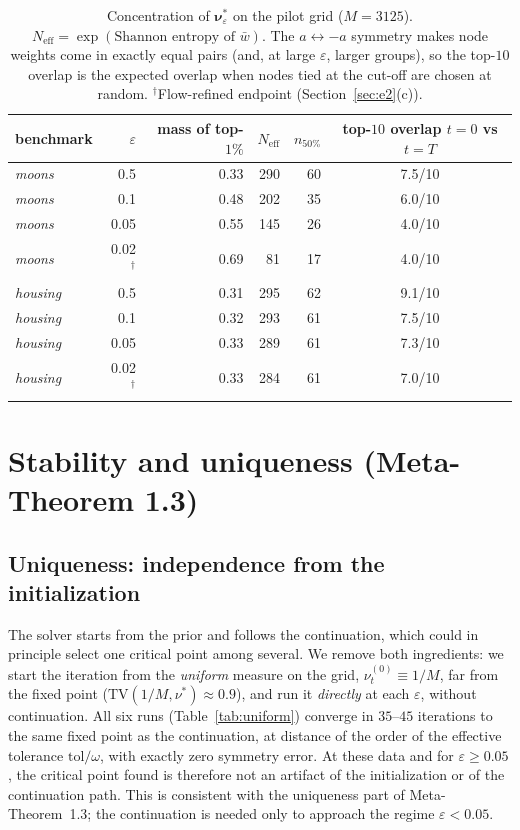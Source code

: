 \documentclass[11pt,leqno]{amsart}
\newcommand{\bnu}{\boldsymbol{\nu}}
\newcommand{\eps}{\varepsilon}
\newcommand{\TV}{\mathrm{TV}}
\numberwithin{equation}{section}
\theoremstyle{definition}
\begin{document}
\begin{table}[ht]
\centering\small
\begin{tabular}{l r rrrc}
\toprule
benchmark & $\eps$ & mass of top-$1\%$ & $N_{\mathrm{eff}}$ & $n_{50\%}$ &
top-$10$ overlap $t=0$ vs $t=T$\\
\midrule
\emph{moons}   & 0.5  & 0.33 & 290 & 60 & 7.5/10\\
\emph{moons}   & 0.1  & 0.48 & 202 & 35 & 6.0/10\\
\emph{moons}   & 0.05 & 0.55 & 145 & 26 & 4.0/10\\
\emph{moons}   & 0.02$^\dagger$ & 0.69 & 81 & 17 & 4.0/10\\
\emph{housing} & 0.5  & 0.31 & 295 & 62 & 9.1/10\\
\emph{housing} & 0.1  & 0.32 & 293 & 61 & 7.5/10\\
\emph{housing} & 0.05 & 0.33 & 289 & 61 & 7.3/10\\
\emph{housing} & 0.02$^\dagger$ & 0.33 & 284 & 61 & 7.0/10\\
\bottomrule
\end{tabular}
\vskip 2pt
\caption{Concentration of $\bnu^*_\eps$ on the pilot grid ($M=3125$).
$N_{\mathrm{eff}}=\exp(\text{Shannon entropy of }\bar w)$.  The
$a\leftrightarrow-a$ symmetry makes node weights come in exactly equal
pairs (and, at large $\eps$, larger groups), so the top-$10$ overlap is the
expected overlap when nodes tied at the cut-off are chosen at random.
$^\dagger$Flow-refined endpoint (Section~\ref{sec:e2}(c)).}
\label{tab:concentration}
\end{table}

\section{Stability and uniqueness (Meta-Theorem 1.3)}
\label{sec:stability}

\subsection{Uniqueness: independence from the initialization}
\label{sec:uniform}
The solver starts from the prior and follows the continuation, which could
in principle select one critical point among several.  We remove both
ingredients: we start the iteration from the \emph{uniform} measure on the
grid, $\nu^{(0)}_t\equiv1/M$, far from the fixed point
($\TV(1/M,\nu^*)\approx0.9$), and run it \emph{directly} at each $\eps$,
without continuation.  All six runs (Table~\ref{tab:uniform}) converge in
$35$--$45$ iterations to the same fixed point as the continuation, at
distance of the order of the effective tolerance $\mathrm{tol}/\omega$, with
exactly zero symmetry error.  At these data and for $\eps\ge0.05$, the
critical point found is therefore not an artifact of the initialization or
of the continuation path.  This is consistent with the uniqueness part of
Meta-Theorem~1.3; the continuation is needed only to approach the regime
$\eps<0.05$.
\end{document}
